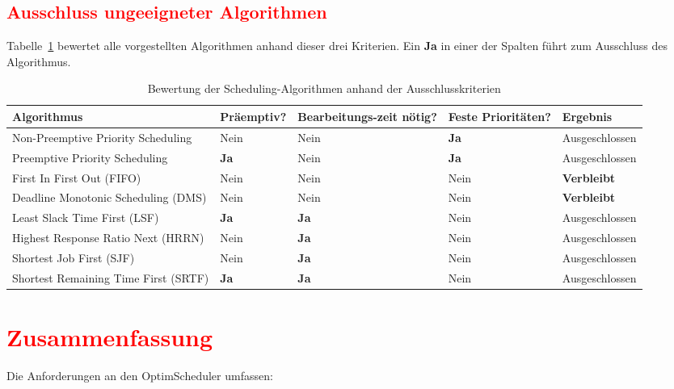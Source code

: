 \documentclass[
    12pt,               
    a4paper,            
    ngerman,            
    parskip=half,       
    headings=normal,   
    numbers=enddot,     
    toc=chapterentrywithdots 
]{scrreprt}\usepackage[utf8]{inputenc}
\begin{document}
\newpage
\subsection{\textcolor{red}{Ausschluss ungeeigneter Algorithmen}}
Tabelle~\ref{tab:algorithmenauswahl} bewertet alle vorgestellten Algorithmen anhand dieser drei Kriterien. Ein \textbf{Ja} in einer der Spalten führt zum Ausschluss des Algorithmus.

\begin{table}[H]
    \centering
    {\setlength{\arrayrulewidth}{0.3pt}
    \begin{tabular}{|p{}|p{}|p{}|p{}|p{}|}
        \hline
        \textbf{Algorithmus} & \textbf{Präemptiv?} & \textbf{Bearbeitungs-zeit nötig?} & \textbf{Feste Prioritäten?} & \textbf{Ergebnis} \\
        \hline
        Non-Preemptive Priority Scheduling & Nein & Nein & \textbf{Ja} & Ausgeschlossen \\
        \hline
        Preemptive Priority Scheduling & \textbf{Ja} & Nein & \textbf{Ja} & Ausgeschlossen \\
        \hline
        First In First Out (FIFO) & Nein & Nein & Nein & \textbf{Verbleibt} \\
        \hline
        Deadline Monotonic Scheduling (DMS) & Nein & Nein & Nein & \textbf{Verbleibt} \\
        \hline
        Least Slack Time First (LSF) & \textbf{Ja} & \textbf{Ja} & Nein & Ausgeschlossen \\
        \hline
        Highest Response Ratio Next (HRRN) & Nein & \textbf{Ja} & Nein & Ausgeschlossen \\
        \hline
        Shortest Job First (SJF) & Nein & \textbf{Ja} & Nein & Ausgeschlossen \\
        \hline
        Shortest Remaining Time First (SRTF) & \textbf{Ja} & \textbf{Ja} & Nein & Ausgeschlossen \\
        \hline
    \end{tabular}}
    \caption{Bewertung der Scheduling-Algorithmen anhand der Ausschlusskriterien}
    \label{tab:algorithmenauswahl}
\end{table}

\newpage
\section{\textcolor{red}{Zusammenfassung}}
Die Anforderungen an den OptimScheduler umfassen:
\end{document}
